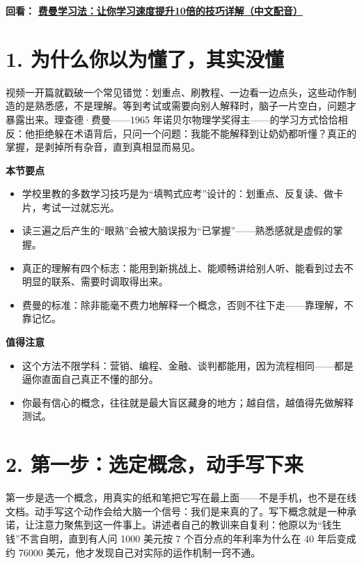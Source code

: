 \documentclass[UTF8,a4paper,11pt]{ctexart}
\newcommand{\videolink}[2]{%
  \href{#1}{\textcolor{videoblue}{\textbf{#2}}}%
}
\begin{document}
\noindent\textbf{回看：}\videolink{https://www.bilibili.com/video/BV1VhU3BrErJ/}{费曼学习法：让你学习速度提升10倍的技巧详解（中文配音）}

\section*{1. 为什么你以为懂了，其实没懂}

视频一开篇就戳破一个常见错觉：划重点、刷教程、一边看一边点头，这些动作制造的是熟悉感，不是理解。等到考试或需要向别人解释时，脑子一片空白，问题才暴露出来。理查德·费曼——1965 年诺贝尔物理学奖得主——的学习方式恰恰相反：他拒绝躲在术语背后，只问一个问题：我能不能解释到让奶奶都听懂？真正的掌握，是剥掉所有杂音，直到真相显而易见。

\begin{keyconcept}
\textbf{本节要点}
\begin{itemize}
  \item 学校里教的多数学习技巧是为“填鸭式应考”设计的：划重点、反复读、做卡片，考试一过就忘光。
  \item 读三遍之后产生的“眼熟”会被大脑误报为“已掌握”——熟悉感就是虚假的掌握。
  \item 真正的理解有四个标志：能用到新挑战上、能顺畅讲给别人听、能看到过去不明显的联系、需要时调取得出来。
  \item 费曼的标准：除非能毫不费力地解释一个概念，否则不往下走——靠理解，不靠记忆。
\end{itemize}
\end{keyconcept}

\begin{keyconcept}
\textbf{值得注意}
\begin{itemize}
  \item 这个方法不限学科：营销、编程、金融、谈判都能用，因为流程相同——都是逼你直面自己真正不懂的部分。
  \item 你最有信心的概念，往往就是最大盲区藏身的地方；越自信，越值得先做解释测试。
\end{itemize}
\end{keyconcept}


\section*{2. 第一步：选定概念，动手写下来}

第一步是选一个概念，用真实的纸和笔把它写在最上面——不是手机，也不是在线文档。动手写这个动作会给大脑一个信号：我们是来真的了。写下概念就是一种承诺，让注意力聚焦到这一件事上。讲述者自己的教训来自复利：他原以为“钱生钱”不言自明，直到有人问 1000 美元按 7 个百分点的年利率为什么在 40 年后变成约 76000 美元，他才发现自己对实际的运作机制一窍不通。
\end{document}
